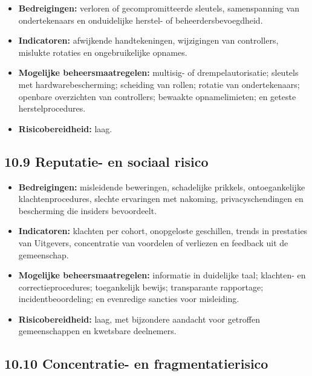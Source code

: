 \documentclass[11pt]{article}
\begin{document}
\begin{itemize}[leftmargin=*]
\item \textbf{Bedreigingen:} verloren of gecompromitteerde sleutels, samenspanning van ondertekenaars en onduidelijke herstel- of beheerdersbevoegdheid.
\item \textbf{Indicatoren:} afwijkende handtekeningen, wijzigingen van controllers, mislukte rotaties en ongebruikelijke opnames.
\item \textbf{Mogelijke beheersmaatregelen:} multisig- of drempelautorisatie; sleutels met hardwarebescherming; scheiding van rollen; rotatie van ondertekenaars; openbare overzichten van controllers; bewaakte opnamelimieten; en geteste herstelprocedures.
\item \textbf{Risicobereidheid:} laag.
\end{itemize}
\subsection*{10.9 Reputatie- en sociaal risico}

\begin{itemize}[leftmargin=*]
\item \textbf{Bedreigingen:} misleidende beweringen, schadelijke prikkels, ontoegankelijke klachtenprocedures, slechte ervaringen met nakoming, privacyschendingen en bescherming die insiders bevoordeelt.
\item \textbf{Indicatoren:} klachten per cohort, onopgeloste geschillen, trends in prestaties van Uitgevers, concentratie van voordelen of verliezen en feedback uit de gemeenschap.
\item \textbf{Mogelijke beheersmaatregelen:} informatie in duidelijke taal; klachten- en correctieprocedures; toegankelijk bewijs; transparante rapportage; incidentbeoordeling; en evenredige sancties voor misleiding.
\item \textbf{Risicobereidheid:} laag, met bijzondere aandacht voor getroffen gemeenschappen en kwetsbare deelnemers.
\end{itemize}
\subsection*{10.10 Concentratie- en fragmentatierisico}
\end{document}

